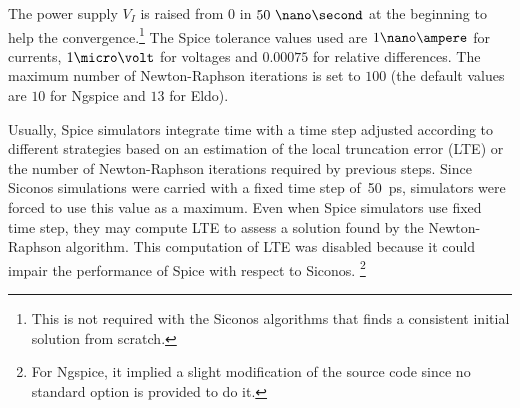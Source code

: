 The power supply $V_I$ is raised from 0 in $50~\nano\second$ at the beginning to help the convergence.\footnote{This is
not required with the {\sc Siconos} algorithms that finds a consistent initial solution from scratch.}
The {\sc Spice} tolerance values used are $1\nano\ampere$ for currents, $1\micro\volt$ for voltages and $0.00075$ for relative differences.
The maximum number of Newton-Raphson iterations is set to $100$ (the default values are $10$ for
{\sc Ngspice} and $13$ for {\sc Eldo}).

Usually, {\sc Spice} simulators integrate time with a time step adjusted according to different strategies based on an estimation
of the local truncation error (LTE) or the number of Newton-Raphson iterations required by previous steps.
Since {\sc Siconos} simulations were carried with a fixed time step of~50~ps, simulators were forced to use this value as a maximum.
Even when {\sc Spice} simulators use fixed time step, they may compute LTE to assess a solution found by the Newton-Raphson
algorithm. This computation of LTE was disabled because it could impair the performance of {\sc Spice} with respect to {\sc Siconos}.
\footnote{For {\sc Ngspice}, it implied a slight modification of the source code since no standard option is provided to do it.}

